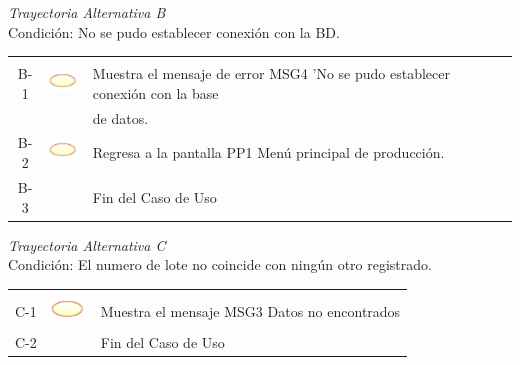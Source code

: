 \documentclass[10pt,spanish]{article}
\providecommand{\tabularnewline}{\\}
\begin{document}
	\textit{Trayectoria Alternativa B}\\
	Condición: No se pudo establecer conexión con la BD.\\
	\begin{tabular}{ccl}
	& & \tabularnewline
	B-1 & \includegraphics{sistema} & Muestra el mensaje de error MSG4 'No se pudo establecer conexión con la base\tabularnewline
	& & de datos.\tabularnewline
	B-2 & \includegraphics{sistema} & Regresa a la pantalla PP1 Menú principal de producción.\tabularnewline
	B-3 & & Fin del Caso de Uso\tabularnewline	
	\end{tabular}	
	
	\textit{Trayectoria Alternativa C}\\
	Condición: El numero de lote no coincide con ningún otro registrado.\\
	\begin{tabular}{ccl}
	& & \tabularnewline
	C-1 & \includegraphics{sistema} & Muestra el mensaje MSG3 Datos no encontrados\tabularnewline	
	C-2 & & Fin del Caso de Uso\tabularnewline
	\end{tabular}	

\end{document}

